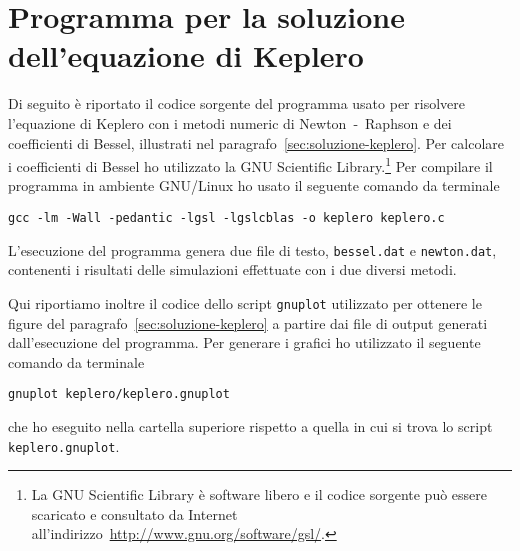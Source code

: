 \chapter{Programma per la soluzione dell'equazione di Keplero}
\label{cha:soluzione-keplero}

Di seguito è riportato il codice sorgente del programma usato per risolvere
l'equazione di Keplero con i metodi numeric di Newton~-~Raphson e dei
coefficienti di Bessel, illustrati nel
paragrafo~\ref{sec:soluzione-keplero}. Per calcolare i coefficienti di Bessel ho
utilizzato la GNU Scientific
Library.\footnote{La GNU Scientific Library è software libero e il codice
  sorgente può essere scaricato e consultato da Internet
  all'indirizzo~\url{http://www.gnu.org/software/gsl/}.}
Per compilare il programma in ambiente GNU/Linux ho usato il seguente comando da
terminale
\begin{verbatim}
gcc -lm -Wall -pedantic -lgsl -lgslcblas -o keplero keplero.c
\end{verbatim}
L'esecuzione del programma genera due file di testo, \verb|bessel.dat| e
\verb|newton.dat|, contenenti i risultati delle simulazioni effettuate con i due
diversi metodi.
% 

Qui riportiamo inoltre il codice dello script \verb|gnuplot| utilizzato per
ottenere le figure del paragrafo~\ref{sec:soluzione-keplero} a partire dai file
di output generati dall'esecuzione del programma. Per generare i grafici ho
utilizzato il seguente comando da terminale
\begin{verbatim}
gnuplot keplero/keplero.gnuplot
\end{verbatim}
che ho eseguito nella cartella superiore rispetto a quella in cui si trova lo
script \verb|keplero.gnuplot|.


